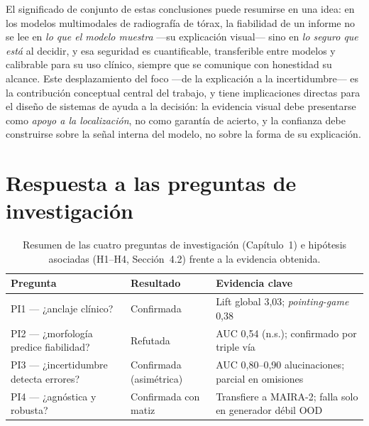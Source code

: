 El significado de conjunto de estas conclusiones puede resumirse en una idea: en los modelos
multimodales de radiografía de tórax, la fiabilidad de un informe no se lee en \emph{lo que el modelo
muestra} —su explicación visual— sino en \emph{lo seguro que está} al decidir, y esa seguridad es
cuantificable, transferible entre modelos y calibrable para su uso clínico, siempre que se comunique
con honestidad su alcance. Este desplazamiento del foco —de la explicación a la incertidumbre— es la
contribución conceptual central del trabajo, y tiene implicaciones directas para el diseño de sistemas
de ayuda a la decisión: la evidencia visual debe presentarse como \emph{apoyo a la localización}, no
como garantía de acierto, y la confianza debe construirse sobre la señal interna del modelo, no sobre
la forma de su explicación.

\clearpage
\section{Respuesta a las preguntas de investigación}

\begin{table}[h]\centering
\caption{Resumen de las cuatro preguntas de investigación (Capítulo~1) e hipótesis asociadas
(H1--H4, Sección~4.2) frente a la evidencia obtenida.}
\label{tab:resumen_pi}
\begin{tabular}{lp{2.6cm}p{5.5cm}}
\toprule
Pregunta & Resultado & Evidencia clave \\ \midrule
PI1 — ¿anclaje clínico? & Confirmada & Lift global 3,03; \textit{pointing-game} 0,38 \\
PI2 — ¿morfología predice fiabilidad? & Refutada & AUC 0,54 (n.s.); confirmado por triple vía \\
PI3 — ¿incertidumbre detecta errores? & Confirmada (asimétrica) & AUC 0,80--0,90 alucinaciones; parcial en omisiones \\
PI4 — ¿agnóstica y robusta? & Confirmada con matiz & Transfiere a MAIRA-2; falla solo en generador débil OOD \\
\bottomrule
\end{tabular}
\end{table}

